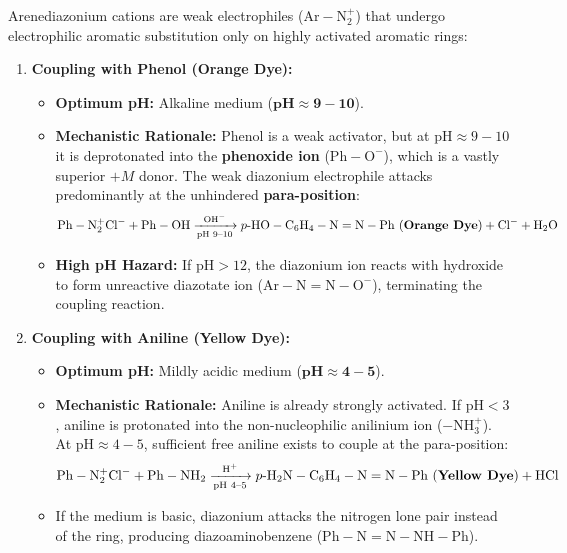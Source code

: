 \documentclass[10pt,a4paper]{article}
\begin{document}
\begin{conceptbox}
Arenediazonium cations are weak electrophiles ($\mathrm{Ar-N_2^+}$) that undergo electrophilic aromatic substitution only on highly activated aromatic rings:
\begin{enumerate}[leftmargin=*]
  \item \textbf{Coupling with Phenol (Orange Dye):}
  \begin{itemize}
    \item \textbf{Optimum pH:} Alkaline medium ($\mathbf{pH \approx 9-10}$).
    \item \textbf{Mechanistic Rationale:} Phenol is a weak activator, but at $\mathrm{pH} \approx 9-10$ it is deprotonated into the \textbf{phenoxide ion} ($\mathrm{Ph-O^-}$), which is a vastly superior $+M$ donor. The weak diazonium electrophile attacks predominantly at the unhindered \textbf{para-position}:
    \begin{equation}
      \mathrm{Ph-N_2^+Cl^-} + \mathrm{Ph-OH} \xrightarrow[\text{pH 9--10}]{\mathrm{OH^-}} p\text{-}\mathrm{HO-C_6H_4-N=N-Ph} \text{ (\textbf{Orange Dye})} + \mathrm{Cl^-} + \mathrm{H_2O}
    \end{equation}
    \item \textbf{High pH Hazard:} If $\mathrm{pH} > 12$, the diazonium ion reacts with hydroxide to form unreactive diazotate ion ($\mathrm{Ar-N=N-O^-}$), terminating the coupling reaction.
  \end{itemize}
  \item \textbf{Coupling with Aniline (Yellow Dye):}
  \begin{itemize}
    \item \textbf{Optimum pH:} Mildly acidic medium ($\mathbf{pH \approx 4-5}$).
    \item \textbf{Mechanistic Rationale:} Aniline is already strongly activated. If $\mathrm{pH} < 3$, aniline is protonated into the non-nucleophilic anilinium ion ($-\mathrm{NH_3^+}$). At $\mathrm{pH} \approx 4-5$, sufficient free aniline exists to couple at the para-position:
    \begin{equation}
      \mathrm{Ph-N_2^+Cl^-} + \mathrm{Ph-NH_2} \xrightarrow[\text{pH 4--5}]{\mathrm{H^+}} p\text{-}\mathrm{H_2N-C_6H_4-N=N-Ph} \text{ (\textbf{Yellow Dye})} + \mathrm{HCl}
    \end{equation}
    \item If the medium is basic, diazonium attacks the nitrogen lone pair instead of the ring, producing diazoaminobenzene ($\mathrm{Ph-N=N-NH-Ph}$).
  \end{itemize}
\end{enumerate}
\end{conceptbox}
\end{document}
